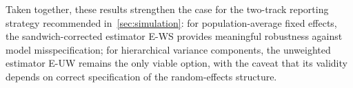 Taken together, these results strengthen the case for the two-track
reporting strategy recommended in~\cref{sec:simulation}: for
population-average fixed effects, the sandwich-corrected estimator
E-WS provides meaningful robustness against model misspecification;
for hierarchical variance components, the unweighted estimator E-UW
remains the only viable option, with the caveat that its validity
depends on correct specification of the random-effects structure.
